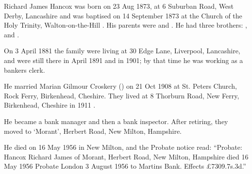 
Richard James Hancox was born on 23 Aug 1873, at 6 Suburban Road, West Derby, Lancashire \cite{RJHancoxBirth} and was baptised on 14 September 1873 at the Church of the Holy Trinity, Walton-on-the-Hill \cite{RJHancoxBaptism}.  His parents were  and  . He had three brothers:
,  and .

On 3 April 1881 the family were living at 30 Edge Lane, Liverpool, Lancashire, \cite{RJHancoxResidence1} and were still there in April 1891 \cite{RJHancoxResidence2} and in 1901; by that time he was working as a bankers clerk.\cite{RJHancoxOccupation}

He married Marian Gilmour Croskery () on 21 Oct 1908 at St. Peters Church,  Rock Ferry, Birkenhead, Cheshire.\cite{RJHancoxMarriage} They lived at 8 Thorburn Road, New Ferry, Birkenhead, Cheshire in 1911 \cite{RJHancoxResidence3}.

He became a bank manager and then a bank inspector.  After retiring, they moved to `Morant', Herbert Road, New Milton, Hampshire.\cite{RJHancoxResidence4}

He died on 16 May 1956 in New Milton,  and the Probate notice read:
``Probate: Hancox Richard James of Morant, Herbert Road, New Milton, Hampshire died 16 May 1956 Probate London 3 August 1956 to Martins Bank. Effects \pounds 7309.7s.3d.''\cite{RJHancoxDeath}
